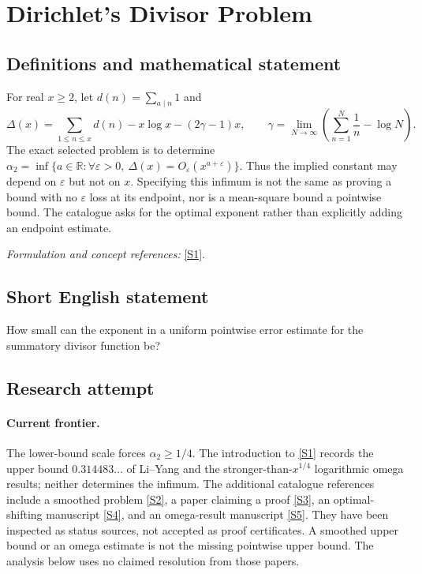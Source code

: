 \documentclass[11pt,a4paper]{article}
\newcommand{\R}{\mathbb{R}}
\newcommand{\eps}{\varepsilon}
\newcommand{\sref}[2]{\hyperlink{source:#1:#2}{[S#2]}}
\newif\ifshowcatalogue
\newcommand{\cataloguescope}[1]{\ifshowcatalogue
 \paragraph{Exact scope in the supplied catalogue.}
 \begin{quote}\small #1\end{quote}\fi}
\numberwithin{equation}{section}
\begin{document}
\setcounter{section}{0}
\clearpage
\section*{\texorpdfstring{Dirichlet's Divisor Problem}{Dirichlet's Divisor Problem}}\label{1278}
\subsection{Definitions and mathematical statement}
For real $x\ge2$, let $d(n)=\sum_{a\mid n}1$ and
\[
 \Delta(x)=\sum_{1\le n\le x}d(n)-x\log x-(2\gamma-1)x,
 \qquad \gamma=\lim_{N\to\infty}\left(\sum_{n=1}^N\frac1n-\log N\right).
\]
The exact selected problem is to determine
$\alpha_2=\inf\{a\in\R:\forall\eps>0,\ \Delta(x)=O_\eps(x^{a+\eps})\}$.
Thus the implied constant may depend on $\eps$ but not on $x$. Specifying this infimum is not the same as proving a bound with no $\eps$ loss at its endpoint, nor is a mean-square bound a pointwise bound. The catalogue asks for the optimal exponent rather than explicitly adding an endpoint estimate.
\par\smallskip\textit{Formulation and concept references:} \sref{1278}{1}.
\cataloguescope{Let d(n) count the positive divisors of n and Delta(x)=sum\_\{n<=x\} d(n)-x log x-(2 gamma-1)x for real x>=2. Determine the optimal exponent alpha\_2=inf\{a: for every epsilon>0, Delta(x)=O\_epsilon(x\textasciicircum{}(a+epsilon)) as x tends to infinity\}.}
\subsection{Short English statement}
How small can the exponent in a uniform pointwise error estimate for the summatory divisor function be?
\subsection{Research attempt}

\paragraph{Current frontier.}
The lower-bound scale forces $\alpha_2\ge1/4$. The introduction to
\sref{1278}{1} records the upper bound $0.314483\ldots$ of Li--Yang and the
stronger-than-$x^{1/4}$ logarithmic omega results; neither determines the
infimum. The additional catalogue references include a smoothed problem
\sref{1278}{2}, a paper claiming a proof \sref{1278}{3}, an optimal-shifting
manuscript \sref{1278}{4}, and an omega-result manuscript \sref{1278}{5}.
They have been inspected as status sources, not accepted as proof
certificates. A smoothed upper bound or an omega estimate is not the missing
pointwise upper bound. The analysis below uses no claimed resolution from
those papers.
\end{document}
